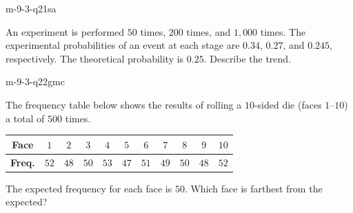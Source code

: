 \begin{practiceQuestion}{m-9-3-q21}{sa}
\begin{questionText}
An experiment is performed $50$ times, $200$ times, and $1{,}000$ times. The experimental probabilities of an event at each stage are $0.34$, $0.27$, and $0.245$, respectively. The theoretical probability is $0.25$. Describe the trend.
\end{questionText}
\end{practiceQuestion}


\begin{practiceQuestion}{m-9-3-q22}{gmc}
\begin{questionText}
The frequency table below shows the results of rolling a $10$-sided die (faces $1$--$10$) a total of $500$ times.

\begin{center}
\begin{tabular}{|c|c|c|c|c|c|c|c|c|c|c|}
\hline
\textbf{Face} & $1$ & $2$ & $3$ & $4$ & $5$ & $6$ & $7$ & $8$ & $9$ & $10$ \\
\hline
\textbf{Freq.} & $52$ & $48$ & $50$ & $53$ & $47$ & $51$ & $49$ & $50$ & $48$ & $52$ \\
\hline
\end{tabular}
\end{center}

The expected frequency for each face is $50$. Which face is farthest from the expected?
\end{questionText}
\end{practiceQuestion}

